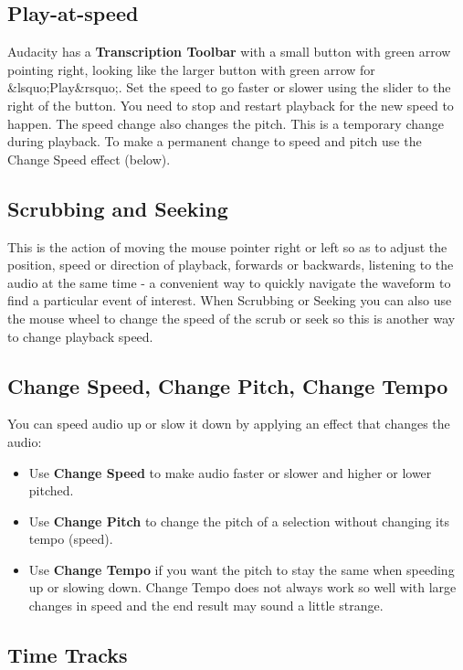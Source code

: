 \documentclass[twocolumn]{book}
\begin{document}
\subsection{Play-at-speed}


Audacity has a \textbf{Transcription Toolbar} with a small button with green arrow pointing right, looking like the larger button with green arrow for \&lsquo;Play\&rsquo;.  Set the speed to go faster or slower using the slider to the right of the button.  You need to stop and restart playback for the new speed to happen. The speed change also changes the pitch.  This is a temporary change during playback.  To make a permanent change to speed and pitch use the Change Speed effect (below).

\subsection{Scrubbing and Seeking}


This is the action of moving the mouse pointer right or left so as to adjust the position, speed or direction of playback, forwards or backwards, listening to the audio at the same time - a convenient way to quickly navigate the waveform to find a particular event of interest. When Scrubbing or Seeking you can also use the mouse wheel to change the speed of the scrub or seek so this is another way to change playback speed.

\subsection{Change Speed, Change Pitch, Change Tempo}


You can speed audio up or slow it down by applying an effect that changes the audio:  
\begin{itemize}
\item  Use \textbf{Change Speed} to make audio faster or slower and higher or lower pitched. 
\item  Use \textbf{Change Pitch} to change the pitch of a selection without changing its tempo (speed). 
\item  Use \textbf{Change Tempo} if you want the pitch to stay the same when speeding up or slowing down. Change Tempo does not always work so well with large changes in speed and the end result may sound a little strange.
\end{itemize}

\subsection{Time Tracks}
\end{document}
